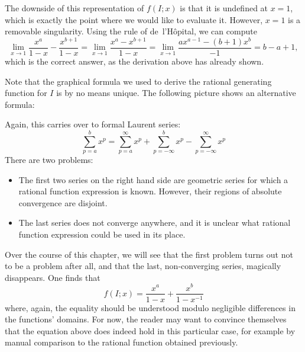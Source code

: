 The downside of this representation of $f(I;x)$ is that it is undefined at $x = 1$,
which is exactly the point where we would like to evaluate it.
However, $x = 1$ is a removable singularity.
Using the rule of de~l'Hôpital, we can compute
\[
  \lim_{x \to 1} \frac{x^a}{1 - x} - \frac{x^{b + 1}}{1 - x} = \lim_{x \to 1} \frac{x^a - x^{b+1}}{1 - x} = \lim_{x \to 1} \frac{a x^{a-1} - (b+1) x^b}{-1} = b - a + 1,
\]
which is the correct answer, as the derivation above has already shown.

Note that the graphical formula we used to derive the rational generating function for $I$ is by no means unique.
The following picture shows an alternative formula:
\begin{center}
\end{center}
Again, this carries over to formal Laurent series:
\[
  \sum_{p = a}^b x^p = \sum_{p = a}^\infty x^p + \sum_{p = -\infty}^b x^p - \sum_{p = -\infty}^\infty x^p
\]
There are two problems:
\begin{itemize}
  \item The first two series on the right hand side are geometric series for which a rational function expression is known.
    However, their regions of absolute convergence are disjoint.

  \item The last series does not converge anywhere, and it is unclear what rational function expression could be used in its place.
\end{itemize}
Over the course of this chapter,
we will see that the first problem turns out not to be a problem after all,
and that the last, non-converging series, magically disappears.
One finds that
\[
  f(I;x) = \frac{x^a}{1-x} + \frac{x^b}{1-x^{-1}}
\]
where, again, the equality should be understood modulo negligible differences in the functions' domains.
For now, the reader may want to convince themselves that the equation above does indeed hold in this particular case,
for example by manual comparison to the rational function obtained previously.

